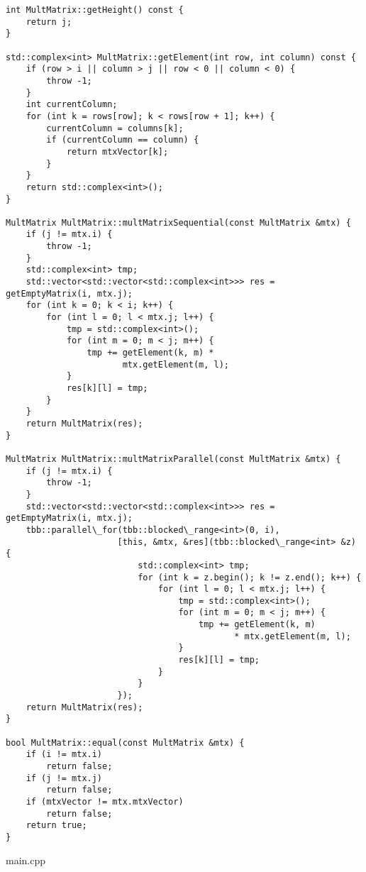 \documentclass{report}
\begin{document}
\begin{lstlisting}
int MultMatrix::getHeight() const {
    return j;
}

std::complex<int> MultMatrix::getElement(int row, int column) const {
    if (row > i || column > j || row < 0 || column < 0) {
        throw -1;
    }
    int currentColumn;
    for (int k = rows[row]; k < rows[row + 1]; k++) {
        currentColumn = columns[k];
        if (currentColumn == column) {
            return mtxVector[k];
        }
    }
    return std::complex<int>();
}

MultMatrix MultMatrix::multMatrixSequential(const MultMatrix &mtx) {
    if (j != mtx.i) {
        throw -1;
    }
    std::complex<int> tmp;
    std::vector<std::vector<std::complex<int>>> res = getEmptyMatrix(i, mtx.j);
    for (int k = 0; k < i; k++) {
        for (int l = 0; l < mtx.j; l++) {
            tmp = std::complex<int>();
            for (int m = 0; m < j; m++) {
                tmp += getElement(k, m) *
                       mtx.getElement(m, l);
            }
            res[k][l] = tmp;
        }
    }
    return MultMatrix(res);
}

MultMatrix MultMatrix::multMatrixParallel(const MultMatrix &mtx) {
    if (j != mtx.i) {
        throw -1;
    }
    std::vector<std::vector<std::complex<int>>> res = getEmptyMatrix(i, mtx.j);
    tbb::parallel\_for(tbb::blocked\_range<int>(0, i),
                      [this, &mtx, &res](tbb::blocked\_range<int> &z) {
                          std::complex<int> tmp;
                          for (int k = z.begin(); k != z.end(); k++) {
                              for (int l = 0; l < mtx.j; l++) {
                                  tmp = std::complex<int>();
                                  for (int m = 0; m < j; m++) {
                                      tmp += getElement(k, m)
                                             * mtx.getElement(m, l);
                                  }
                                  res[k][l] = tmp;
                              }
                          }
                      });
    return MultMatrix(res);
}

bool MultMatrix::equal(const MultMatrix &mtx) {
    if (i != mtx.i)
        return false;
    if (j != mtx.j)
        return false;
    if (mtxVector != mtx.mtxVector)
        return false;
    return true;
}

\end{lstlisting}
main.cpp
\end{document}
